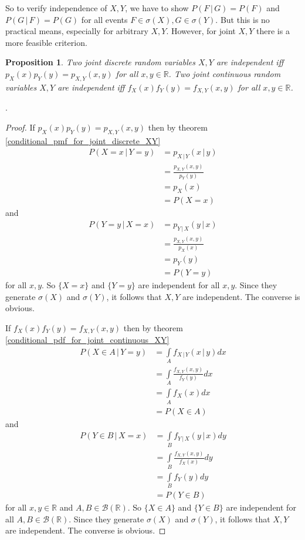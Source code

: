 \documentclass[12pt]{amsart}
\newtheorem{proposition}[theorem]{Proposition}
\theoremstyle{definition}
\begin{document}
So to verify independence of $X, Y$, we have to show $P(F \,|\, G) = P(F)$ and $P(G \,|\, F) = P(G)$ for all events $F \in \sigma(X), G \in \sigma(Y)$. But this is no practical means, especially for arbitrary $X, Y$. However, for joint $X, Y$ there is a more feasible criterion.

\begin{proposition} \label{independence_of_XY_1} Two joint discrete random variables $X, Y$ are independent iff $p_X(x)p_Y(y) = p_{X, Y}(x, y)$ for all $x, y \in \mathbb{R}$. Two joint continuous random variables $X, Y$ are independent iff $f_X(x)f_Y(y) = f_{X, Y}(x, y)$ for all $x, y \in \mathbb{R}$.
\end{proposition}.
\begin{proof} If $p_X(x)p_Y(y) = p_{X, Y}(x, y)$ then by theorem \ref{conditional_pmf_for_joint_discrete_XY}
\begin{align*}
P(X = x \,|\, Y = y) & = p_{X \,|\, Y}(x \,|\, y) \\
 & = \frac{p_{X, Y}(x, y)}{p_Y(y)} \\
 & = p_X(x) \\
 & = P(X = x)
\end{align*}
and
\begin{align*}
P(Y = y \,|\, X = x) & = p_{Y \,|\, X}(y \,|\, x) \\ 
 & = \frac{p_{X, Y}(x, y)}{p_X(x)} \\
 & = p_Y(y) \\
 & = P(Y = y)
\end{align*}
for all $x, y$. So $\{X = x\}$ and $\{Y = y\}$ are independent for all $x, y$. Since they generate $\sigma(X)$ and $\sigma(Y)$, it follows that $X, Y$ are independent. The converse is obvious.

If $f_X(x)f_Y(y) = f_{X, Y}(x, y)$ then by theorem \ref{conditional_pdf_for_joint_continuous_XY}
\begin{align*}
P(X \in A \,|\, Y = y) & = \int\limits_A f_{X\,|\, Y}(x \,|\, y) dx \\
 & = \int\limits_A \frac{f_{X, Y}(x, y)}{f_Y(y)} dx \\
 & = \int\limits_A f_X(x) dx \\
 & = P(X \in A)
\end{align*}
and
\begin{align*}
P(Y \in B \,|\, X = x) & = \int\limits_B f_{Y\,|\, X}(y \,|\, x) dy \\
 & = \int\limits_B \frac{f_{X, Y}(x, y)}{f_X(x)} dy \\
 & = \int\limits_B f_Y(y) dy \\
 & = P(Y \in B)
\end{align*}
for all $x, y \in \mathbb{R}$ and $A, B \in \mathcal{B}(\mathbb{R})$. So $\{X \in A\}$ and $\{Y \in B\}$ are independent for all $A, B \in \mathcal{B}(\mathbb{R})$. Since they generate $\sigma(X)$ and $\sigma(Y)$, it follows that $X, Y$ are independent. The converse is obvious.
\end{proof}
\end{document}
